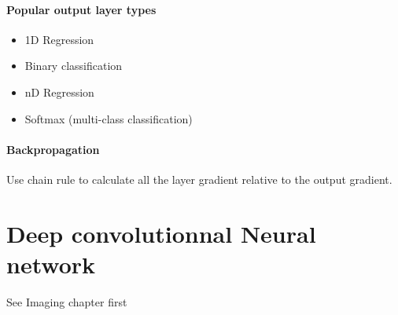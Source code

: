 		\paragraph*{Popular output layer types}
			\begin{itemize}
				\item 1D Regression
				\item Binary classification
				\item nD Regression
				\item Softmax (multi-class classification)
			\end{itemize}

		\paragraph*{Backpropagation}
			Use chain rule to calculate all the layer gradient relative to the output gradient.


\section{Deep convolutionnal Neural network}

	See Imaging chapter first


